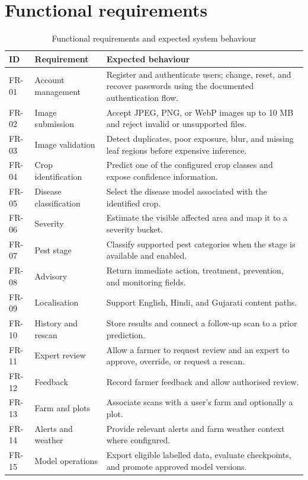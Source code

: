 \documentclass[12pt,a4paper,oneside,openany]{report}
\begin{document}
\section{Functional requirements}
\begin{table}[H]
\centering
\small
\caption{Functional requirements and expected system behaviour}\label{tab:functional-reqs}
\begin{tabular}{P{1.2cm}P{4.2cm}P{8.0cm}}
\toprule
\textbf{ID} & \textbf{Requirement} & \textbf{Expected behaviour}\\
\midrule
FR-01 & Account management & Register and authenticate users; change, reset, and recover passwords using the documented authentication flow.\\
FR-02 & Image submission & Accept JPEG, PNG, or WebP images up to 10 MB and reject invalid or unsupported files.\\
FR-03 & Image validation & Detect duplicates, poor exposure, blur, and missing leaf regions before expensive inference.\\
FR-04 & Crop identification & Predict one of the configured crop classes and expose confidence information.\\
FR-05 & Disease classification & Select the disease model associated with the identified crop.\\
FR-06 & Severity & Estimate the visible affected area and map it to a severity bucket.\\
FR-07 & Pest stage & Classify supported pest categories when the stage is available and enabled.\\
FR-08 & Advisory & Return immediate action, treatment, prevention, and monitoring fields.\\
FR-09 & Localisation & Support English, Hindi, and Gujarati content paths.\\
FR-10 & History and rescan & Store results and connect a follow-up scan to a prior prediction.\\
FR-11 & Expert review & Allow a farmer to request review and an expert to approve, override, or request a rescan.\\
FR-12 & Feedback & Record farmer feedback and allow authorised review.\\
FR-13 & Farm and plots & Associate scans with a user's farm and optionally a plot.\\
FR-14 & Alerts and weather & Provide relevant alerts and farm weather context where configured.\\
FR-15 & Model operations & Export eligible labelled data, evaluate checkpoints, and promote approved model versions.\\
\bottomrule
\end{tabular}
\end{table}
\end{document}
